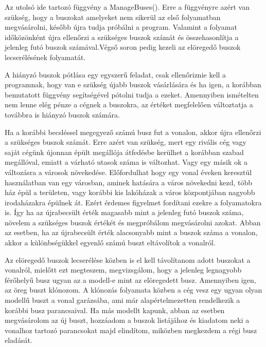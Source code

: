 Az utolsó ide tartozó függvény a ManageBuses(). Erre a függvényre azért van szükség, hogy a buszokat amelyeket nem sikerül az első folyamatban megvásárolni, később újra tudja próbálni a program. Valamint a folyamat időközönként újra ellenőrzi a szükséges buszok számát és összehasonlítja a jelenleg futó buszok számával.Végső soron pedig kezeli az elöregedő buszok lecserélésének folyamatát.

A hiányzó buszok pótlása egy egyszerű feladat, csak ellenőriznie kell a programnak, hogy van e szükség újabb buszok vásárlására és ha igen, a korábban bemutatott függvény segítségével pótolni tudja a ezeket. Amennyiben ismételten nem lenne elég pénze a cégnek a buszokra, az értéket megfelelően változtatja a továbbra is hiányzó buszok számára.

Ha a korábbi becsléssel megegyező számú busz fut a vonalon, akkor újra ellenőrzi a szükséges buszok számát. Erre azért van szükség, mert egy rivális cég vagy saját cégünk újonnan épült megállója átfedésbe kerülhet a korábban szabad megállóval, emiatt a várható utasok száma is változhat. Vagy egy másik ok a változásra a városok növekedése. Előfordulhat hogy egy vonal éveken keresztül használatban van egy városban, aminek hatására a város növekedni kezd, több ház épül a területen, vagy korábbi kis lakóházak a város központjában nagyobb irodaházakra épülnek át. Ezért érdemes figyelmet fordítani ezekre a folyamatokra is. Így ha az újrabecsült érték magasabb mint a jelenleg futó buszok száma, növelem a szükséges buszok értékét és megpróbálom megvásárolni azokat. Abban az esetben, ha az újrabecsült érték alacsonyabb mint a buszok száma a vonalon, akkor a különbségükkel egyenlő számú buszt eltávolítok a vonalról.

Az elöregedő buszok lecserélése közben is el kell távolítanom adott buszokat a vonalról, mielőtt ezt megteszem, megvizsgálom, hogy a jelenleg legnagyobb férőhelyű busz ugyan az a modell-e mint az elöregedett busz. Amennyiben igen, az öreg buszt klónozom. A klónozás folyamata közben a cég vesz egy ugyan olyan modellű buszt a vonal garázsába, ami már alapértelmezetten rendelkezik a korábbi busz parancsaival. Ha más modellt kapunk, abban az esetben megvásárolom az új buszt, hozzáadom a buszok listájához és kiadatom neki a vonalhoz tartozó parancsokat majd elindítom, miközben megkezdem a régi busz eladását.

